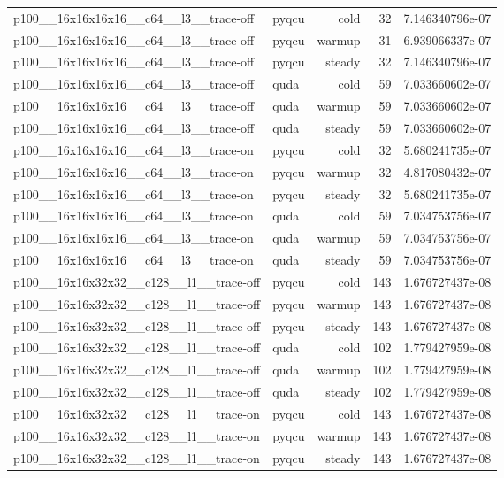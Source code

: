 \begin{table}[htbp]
\begin{tabular}{@{}llrrr@{}}
p100\_\_16x16x16x16\_\_c64\_\_l3\_\_trace-off & pyqcu & cold & 32 & 7.146340796e-07 \\
p100\_\_16x16x16x16\_\_c64\_\_l3\_\_trace-off & pyqcu & warmup & 31 & 6.939066337e-07 \\
p100\_\_16x16x16x16\_\_c64\_\_l3\_\_trace-off & pyqcu & steady & 32 & 7.146340796e-07 \\
p100\_\_16x16x16x16\_\_c64\_\_l3\_\_trace-off & quda & cold & 59 & 7.033660602e-07 \\
p100\_\_16x16x16x16\_\_c64\_\_l3\_\_trace-off & quda & warmup & 59 & 7.033660602e-07 \\
p100\_\_16x16x16x16\_\_c64\_\_l3\_\_trace-off & quda & steady & 59 & 7.033660602e-07 \\
p100\_\_16x16x16x16\_\_c64\_\_l3\_\_trace-on & pyqcu & cold & 32 & 5.680241735e-07 \\
p100\_\_16x16x16x16\_\_c64\_\_l3\_\_trace-on & pyqcu & warmup & 32 & 4.817080432e-07 \\
p100\_\_16x16x16x16\_\_c64\_\_l3\_\_trace-on & pyqcu & steady & 32 & 5.680241735e-07 \\
p100\_\_16x16x16x16\_\_c64\_\_l3\_\_trace-on & quda & cold & 59 & 7.034753756e-07 \\
p100\_\_16x16x16x16\_\_c64\_\_l3\_\_trace-on & quda & warmup & 59 & 7.034753756e-07 \\
p100\_\_16x16x16x16\_\_c64\_\_l3\_\_trace-on & quda & steady & 59 & 7.034753756e-07 \\
p100\_\_16x16x32x32\_\_c128\_\_l1\_\_trace-off & pyqcu & cold & 143 & 1.676727437e-08 \\
p100\_\_16x16x32x32\_\_c128\_\_l1\_\_trace-off & pyqcu & warmup & 143 & 1.676727437e-08 \\
p100\_\_16x16x32x32\_\_c128\_\_l1\_\_trace-off & pyqcu & steady & 143 & 1.676727437e-08 \\
p100\_\_16x16x32x32\_\_c128\_\_l1\_\_trace-off & quda & cold & 102 & 1.779427959e-08 \\
p100\_\_16x16x32x32\_\_c128\_\_l1\_\_trace-off & quda & warmup & 102 & 1.779427959e-08 \\
p100\_\_16x16x32x32\_\_c128\_\_l1\_\_trace-off & quda & steady & 102 & 1.779427959e-08 \\
p100\_\_16x16x32x32\_\_c128\_\_l1\_\_trace-on & pyqcu & cold & 143 & 1.676727437e-08 \\
p100\_\_16x16x32x32\_\_c128\_\_l1\_\_trace-on & pyqcu & warmup & 143 & 1.676727437e-08 \\
p100\_\_16x16x32x32\_\_c128\_\_l1\_\_trace-on & pyqcu & steady & 143 & 1.676727437e-08 \\

\end{tabular}
\end{table}

